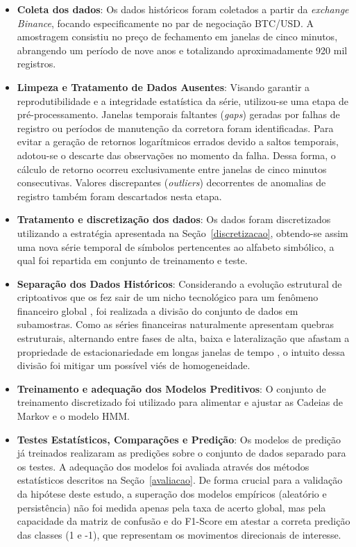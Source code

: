 \documentclass[
    12pt,                %
    openright,           %
    oneside,             %
    a4paper,             %
    english,             %
    brazil               %
]{abntex2}
\begin{document}
\begin{itemize}

    \item \textbf{Coleta dos dados}: Os dados históricos foram coletados a partir da \textit{exchange Binance}, focando especificamente no par
    de negociação BTC/USD. A amostragem consistiu no preço de fechamento em janelas de cinco minutos, abrangendo um período de nove anos e
    totalizando aproximadamente 920 mil registros.

    \item \textbf{Limpeza e Tratamento de Dados Ausentes}: Visando garantir a reprodutibilidade e a integridade estatística da série,
    utilizou-se uma etapa de pré-processamento. Janelas temporais faltantes (\textit{gaps}) geradas por falhas de registro ou
    períodos de manutenção da corretora foram identificadas. Para evitar a geração de retornos logarítmicos errados devido a saltos temporais,
    adotou-se o descarte das observações no momento da falha. Dessa forma, o cálculo de retorno ocorreu exclusivamente entre janelas de cinco
    minutos consecutivas. Valores discrepantes (\textit{outliers}) decorrentes de anomalias de registro também foram descartados nesta etapa.

    \item \textbf{Tratamento e discretização dos dados}: Os dados foram discretizados utilizando
    a estratégia apresentada na Seção~\ref{discretizacao}, obtendo-se assim uma nova série temporal de
    símbolos pertencentes ao alfabeto simbólico, a qual foi repartida em conjunto
    de treinamento e teste.

    \item \textbf{Separação dos Dados Históricos}:
    Considerando a evolução estrutural de criptoativos
    que os fez sair de um nicho tecnológico para um fenômeno financeiro global \cite{MAKAROV2022},
    foi realizada a divisão do conjunto de dados em subamostras. Como as séries financeiras
    naturalmente apresentam quebras estruturais, alternando entre fases de alta, baixa e
    lateralização que afastam a propriedade de estacionariedade em  longas janelas de tempo \cite{morettin2018analise}, o intuito
    dessa divisão foi mitigar um possível viés de homogeneidade.

    \item \textbf{Treinamento e adequação dos Modelos Preditivos}: O conjunto de treinamento discretizado foi utilizado
    para alimentar e ajustar as Cadeias de Markov e o modelo HMM.

    \item \textbf{Testes Estatísticos, Comparações e Predição}: Os modelos de predição já treinados realizaram as predições
    sobre o conjunto de dados separado para os testes. A adequação dos modelos foi avaliada através dos métodos estatísticos
    descritos na Seção~\ref{avaliacao}. De forma crucial para a validação da hipótese deste estudo, a superação dos modelos empíricos
    (aleatório e persistência) não foi medida apenas pela taxa de acerto global, mas pela capacidade da
    matriz de confusão e do F1-Score em atestar a correta predição das classes (1 e -1), que representam os movimentos direcionais de interesse.


\end{itemize}
\end{document}
